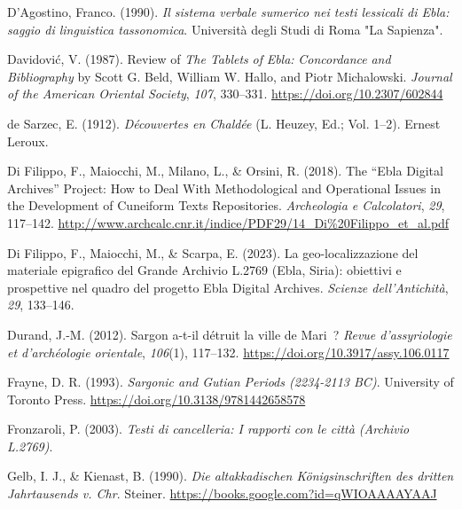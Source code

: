 \documentclass[
]{book}
\newlength{\cslhangindent}
\newlength{\cslentryspacingunit} %
\newenvironment{CSLReferences}[2] %
 {%
  \setlength{\parindent}{0pt}
  \ifodd #1
  \let\oldpar\par
  \def\par{\hangindent=\cslhangindent\oldpar}
  \fi
  \setlength{\parskip}{#2\cslentryspacingunit}
 }%
 {}
\begin{document}
\begin{CSLReferences}{1}{0}
\leavevmode{}%
D'Agostino, Franco. (1990). \emph{Il sistema verbale sumerico nei testi lessicali di Ebla: saggio di linguistica tassonomica}. Università degli Studi di Roma "La Sapienza".

\leavevmode{}%
Davidović, V. (1987). Review of {\emph{The Tablets}}{ \emph{of} }{\emph{Ebla}}{\emph{:} }{\emph{Concordance}}{ \emph{and} }{\emph{Bibliography}} by {Scott G}. {Beld}, {William W}. {Hallo}, and {Piotr Michalowski}. \emph{Journal of the American Oriental Society}, \emph{107}, 330--331. \url{https://doi.org/10.2307/602844}

\leavevmode{}%
de Sarzec, E. (1912). \emph{Découvertes en Chaldée} (L. Heuzey, Ed.; Vol. 1--2). Ernest Leroux.

\leavevmode{}%
Di Filippo, F., Maiocchi, M., Milano, L., \& Orsini, R. (2018). The {``{Ebla Digital Archives}''} {Project}: {How} to {Deal With Methodological} and {Operational Issues} in the {Development} of {Cuneiform Texts Repositories}. \emph{Archeologia e Calcolatori}, \emph{29}, 117--142. \url{http://www.archcalc.cnr.it/indice/PDF29/14_Di\%20Filippo_et_al.pdf}

\leavevmode{}%
Di Filippo, F., Maiocchi, M., \& Scarpa, E. (2023). La geo-localizzazione del materiale epigrafico del Grande Archivio L.2769 (Ebla, Siria): obiettivi e prospettive nel quadro del progetto Ebla Digital Archives. \emph{Scienze dell'Antichità}, \emph{29}, 133--146.

\leavevmode{}%
Durand, J.-M. (2012). Sargon a-t-il détruit la ville de Mari~? \emph{Revue d'assyriologie et d'archéologie orientale}, \emph{106}(1), 117--132. \url{https://doi.org/10.3917/assy.106.0117}

\leavevmode{}%
Frayne, D. R. (1993). \emph{Sargonic and {Gutian Periods} (2234-2113 {BC})}. University of Toronto Press. \url{https://doi.org/10.3138/9781442658578}

\leavevmode{}%
Fronzaroli, P. (2003). \emph{Testi di cancelleria: I rapporti con le città (Archivio L.2769)}.

\leavevmode{}%
Gelb, I. J., \& Kienast, B. (1990). \emph{Die altakkadischen Königsinschriften des dritten Jahrtausends v. Chr}. Steiner. \url{https://books.google.com?id=qWIOAAAAYAAJ}


\end{CSLReferences}
\end{document}

